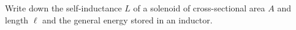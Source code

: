 

\vspace*{\fill}
\centering

Write down the self-inductance $L$ of a solenoid of cross-sectional area $A$ and length $\ell$ and the general energy stored in an inductor.

\centering
\vspace*{\fill}

